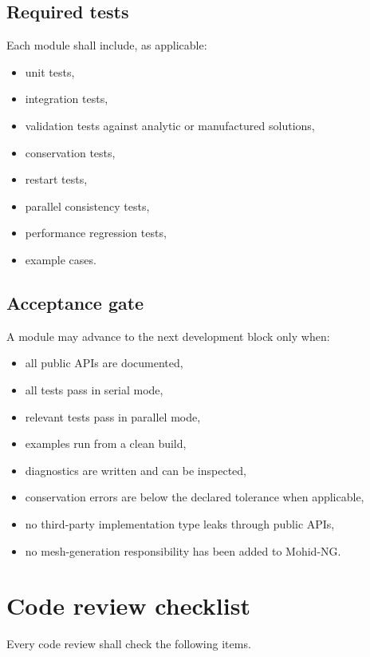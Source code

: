 \documentclass[11pt,a4paper]{article}
\begin{document}
\subsection{Required tests}

Each module shall include, as applicable:

\begin{itemize}
  \item unit tests,
  \item integration tests,
  \item validation tests against analytic or manufactured solutions,
  \item conservation tests,
  \item restart tests,
  \item parallel consistency tests,
  \item performance regression tests,
  \item example cases.
\end{itemize}

\subsection{Acceptance gate}

A module may advance to the next development block only when:

\begin{itemize}
  \item all public APIs are documented,
  \item all tests pass in serial mode,
  \item relevant tests pass in parallel mode,
  \item examples run from a clean build,
  \item diagnostics are written and can be inspected,
  \item conservation errors are below the declared tolerance when applicable,
  \item no third-party implementation type leaks through public APIs,
  \item no mesh-generation responsibility has been added to Mohid-NG.
\end{itemize}

\section{Code review checklist}

Every code review shall check the following items.
\end{document}
